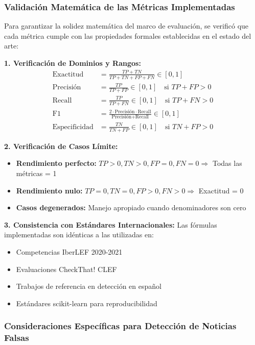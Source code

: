 \subsubsection{Validación Matemática de las Métricas Implementadas}

Para garantizar la solidez matemática del marco de evaluación, se verificó que cada métrica cumple con las propiedades formales establecidas en el estado del arte:

\textbf{1. Verificación de Dominios y Rangos:}
\begin{align}
\text{Exactitud} &= \frac{TP + TN}{TP + TN + FP + FN} \in [0,1] \\
\text{Precisión} &= \frac{TP}{TP + FP} \in [0,1] \quad \text{si } TP + FP > 0 \\
\text{Recall} &= \frac{TP}{TP + FN} \in [0,1] \quad \text{si } TP + FN > 0 \\
\text{F1} &= \frac{2 \cdot \text{Precisión} \cdot \text{Recall}}{\text{Precisión} + \text{Recall}} \in [0,1] \\
\text{Especificidad} &= \frac{TN}{TN + FP} \in [0,1] \quad \text{si } TN + FP > 0
\end{align}

\textbf{2. Verificación de Casos Límite:}
\begin{itemize}
    \item \textbf{Rendimiento perfecto:} $TP > 0, TN > 0, FP = 0, FN = 0 \Rightarrow$ Todas las métricas = 1
    \item \textbf{Rendimiento nulo:} $TP = 0, TN = 0, FP > 0, FN > 0 \Rightarrow$ Exactitud = 0
    \item \textbf{Casos degenerados:} Manejo apropiado cuando denominadores son cero
\end{itemize}

\textbf{3. Consistencia con Estándares Internacionales:}
Las fórmulas implementadas son idénticas a las utilizadas en:
\begin{itemize}
    \item Competencias IberLEF 2020-2021 \cite{aragon2020overview, gomez2021overview}
    \item Evaluaciones CheckThat! CLEF \cite{barron2023clef}
    \item Trabajos de referencia en detección en español \cite{posadas2019detection, blanco2024enhancing}
    \item Estándares scikit-learn para reproducibilidad
\end{itemize}

\subsubsection{Consideraciones Específicas para Detección de Noticias Falsas}

